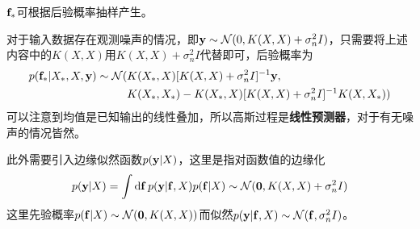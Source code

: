 \documentclass[12pt,UTF8]{article}
\begin{document}
            $\vb{f}_*$可根据后验概率抽样产生。\par
            对于输入数据存在观测噪声的情况，即$\vb{y}\sim\mathcal{N}(0,K(X,X)+\sigma_n^2I)$，只需要将上述内容中的$K(X,X)$用$K(X,X)+\sigma_n^2I$代替即可，后验概率为
            \begin{align}
                p(\vb{f}_*|X_*,X,\vb{y})\sim\mathcal{N}(&K(X_*,X)[K(X,X)+\sigma_n^2I]^{-1}\vb{y},\nonumber \\
                &K(X_*,X_*)-K(X_*,X)[K(X,X)+\sigma_n^2I]^{-1}K(X,X_*))
            \end{align}
            可以注意到均值是已知输出的线性叠加，所以高斯过程是\textbf{线性预测器}，对于有无噪声的情况皆然。\par
            此外需要引入边缘似然函数$p(\vb{y}|X)$，这里是指对函数值的边缘化
            \begin{equation}
                p(\vb{y}|X)=\int{\dd{\vb{f}}p(\vb{y}|\vb{f},X)p(\vb{f}|X)}\sim\mathcal{N}(\vb{0},K(X,X)+\sigma_n^2I)
            \end{equation}
            这里先验概率$p(\vb{f}|X)\sim\mathcal{N}(\vb{0},K(X,X))$而似然$p(\vb{y}|\vb{f},X)\sim\mathcal{N}(\vb{f},\sigma_n^2I)$。
\end{document}
